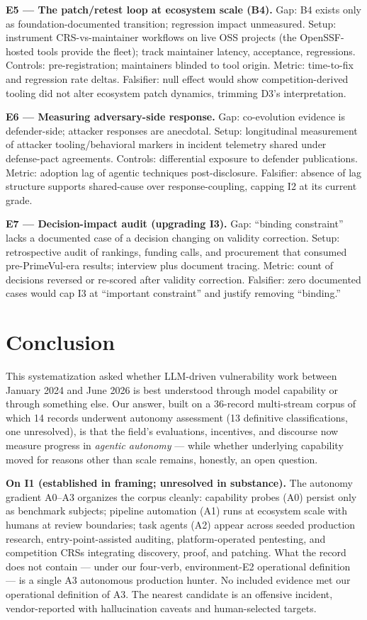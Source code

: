 \documentclass[conference,compsoc]{IEEEtran}
\begin{document}
\textbf{E5 --- The patch/retest loop at ecosystem scale (B4).}
Gap: B4 exists only as foundation-documented transition; regression impact unmeasured.
Setup: instrument CRS-vs-maintainer workflows on live OSS projects (the OpenSSF-hosted tools
provide the fleet); track maintainer latency, acceptance, regressions. Controls:
pre-registration; maintainers blinded to tool origin. Metric: time-to-fix and regression rate
deltas. Falsifier: null effect would show competition-derived tooling did not alter ecosystem
patch dynamics, trimming D3's interpretation.

\textbf{E6 --- Measuring adversary-side response.}
Gap: co-evolution evidence is defender-side; attacker responses are anecdotal. Setup:
longitudinal measurement of attacker tooling/behavioral markers in incident telemetry
shared under defense-pact agreements. Controls: differential exposure to defender
publications. Metric: adoption lag of agentic techniques post-disclosure. Falsifier: absence
of lag structure supports shared-cause over response-coupling, capping I2 at its current grade.

\textbf{E7 --- Decision-impact audit (upgrading I3).}
Gap: ``binding constraint'' lacks a documented case of a decision changing on
validity correction. Setup: retrospective audit of rankings, funding calls, and procurement
that consumed pre-PrimeVul-era results; interview plus document tracing. Metric: count of
decisions reversed or re-scored after validity correction. Falsifier: zero documented cases
would cap I3 at ``important constraint'' and justify removing ``binding.''

\section{Conclusion}
\label{sec:conclusion}

This systematization asked whether LLM-driven vulnerability work between January 2024 and June
2026 is best understood through model capability or through something else. Our answer, built
on a 36-record multi-stream corpus of which 14 records underwent autonomy assessment (13
definitive classifications, one unresolved), is that
the field's evaluations, incentives, and discourse now measure progress in \emph{agentic
autonomy} --- while whether underlying capability moved for reasons other than scale remains,
honestly, an open question.

\textbf{On I1 (established in framing; unresolved in substance).} The autonomy gradient A0--A3
organizes the corpus cleanly: capability probes (A0) persist only as benchmark subjects;
pipeline automation (A1) runs at ecosystem scale with humans at review boundaries; task agents
(A2) appear across seeded production research, entry-point-assisted auditing, platform-operated
pentesting, and competition CRSs integrating discovery, proof, and patching. What the record
does not contain --- under our four-verb, environment-E2 operational definition --- is a single
A3 autonomous production hunter. No included evidence met our operational definition of A3. The nearest candidate is an offensive incident,
vendor-reported with hallucination caveats and human-selected targets.
\end{document}
